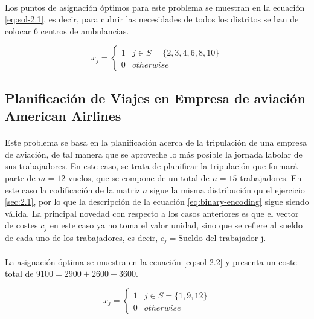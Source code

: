 \documentclass[spanish]{article}
\begin{document}
			\paragraph{}
			Los puntos de asignación óptimos para este problema se muestran en la ecuación \eqref{eq:sol-2.1}, es decir, para cubrir las necesidades de todos los distritos se han de colocar $6$ centros de ambulancias.

			\begin{equation}
			\label{eq:sol-2.1}
				x_{j} =
					\begin{cases}
		      	1 & j \in S = \{2,  3,  4,  6,  8,  10 \} \\
		      	0 & otherwise
			   	\end{cases}
			\end{equation}


		\subsection{Planificación de Viajes en Empresa de aviación American Airlines}
		\label{sec:2.2}

			\paragraph{}
			Este problema se basa en la planificación acerca de la tripulación de una empresa de aviación, de tal manera que se aproveche lo más posible la jornada labolar de sus trabajadores. En este caso, se trata de planificar la tripulación que formará parte de $m = 12$ vuelos, que se compone de un total de $n = 15$ trabajadores. En este caso la codificación de la matriz $a$ sigue la misma distribución qu el ejercicio \ref{sec:2.1}, por lo que la descripción de la ecuación \eqref{eq:binary-encoding} sigue siendo válida. La principal novedad con respecto a los casos anteriores es que el vector de costes $c_j$ en este caso ya no toma el valor unidad, sino que se refiere al sueldo de cada uno de los trabajadores, es decir, $c_j = \text{Sueldo del trabajador j}$.

			\paragraph{}
			La asignación óptima se muestra en la ecuación \eqref{eq:sol-2.2} y presenta un coste total de $9100 = 2900 + 2600 + 3600$.

			\begin{equation}
			\label{eq:sol-2.2}
				x_{j} =
					\begin{cases}
		      	1 & j \in S = \{ 1, 9, 12  \} \\
		      	0 & otherwise
			   	\end{cases}
			\end{equation}
\end{document}
